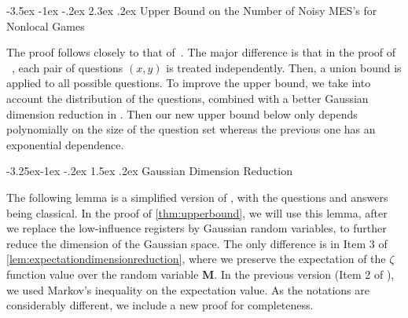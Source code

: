 \documentclass[10pt,a4paper]{article}
\makeatletter
\renewcommand{\section}{\@startsection {section}{1}{\z@}%
             {-3.5ex \@plus -1ex \@minus -.2ex}%
             {2.3ex \@plus .2ex}%
             {\normalfont\Large\scshape\bfseries}}
\renewcommand{\subsection}{\@startsection{subsection}{2}{\z@}%
             {-3.25ex\@plus -1ex \@minus -.2ex}%
             {1.5ex \@plus .2ex}%
             {\normalfont\large\scshape\bfseries}}
\theoremstyle{plain}
\theoremstyle{definition}
\newcommand{\randM}{\ensuremath{\mathbf{M}}}
\newcommand{\1}{\mathbb{1}} %
\makeatother
\begin{document}
\section{Upper Bound on the Number of Noisy MES's for Nonlocal Games}
\label{sec:upperbound}

The proof follows closely to that of~\cite{qin2021nonlocal}. The major difference is that in the proof of ~\cite{qin2021nonlocal}, each pair of questions $(x,y)$ is treated independently. Then, a union bound is applied to all possible questions. To improve the upper bound, we take into account the distribution of the questions, combined with a better Gaussian dimension reduction in \cite{qin_et_al:LIPIcs.ICALP.2023.97}.
Then
our new upper bound below only depends polynomially on the size of the question set
whereas the previous one has an exponential dependence.


\subsection{Gaussian Dimension Reduction}

The following lemma is a simplified version of \cite[Lemma 5.13]{qin_et_al:LIPIcs.ICALP.2023.97}, with the questions and answers being classical.
In the proof of \cref{thm:upperbound},
we will use this lemma, after we replace the low-influence registers by Gaussian random variables, to further reduce the dimension of the Gaussian space.
The only difference is in Item 3 of \cref{lem:expectationdimensionreduction}, where we preserve the expectation of the $\zeta$ function value over the random variable $\randM$.
In the previous version (Item 2 of \cite[Lemma 5.13]{qin_et_al:LIPIcs.ICALP.2023.97}), we used Markov's inequality on the expectation value.
As the notations are considerably different, we include a new proof for completeness.
\end{document}
